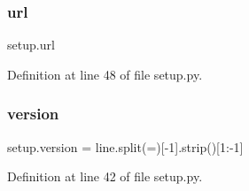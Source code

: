 \hypertarget{namespacesetup_afc13124aa5c0124e84e1d965e3f4b0fb}{}\label{namespacesetup_afc13124aa5c0124e84e1d965e3f4b0fb} 
\subsubsection{\texorpdfstring{url}{url}}
{\footnotesize\ttfamily setup.\+url}



Definition at line 48 of file setup.\+py.

\hypertarget{namespacesetup_a2aa722b36a933088812b50ea79b97a5c}{}\label{namespacesetup_a2aa722b36a933088812b50ea79b97a5c} 
\subsubsection{\texorpdfstring{version}{version}}
{\footnotesize\ttfamily setup.\+version = line.\+split(\textquotesingle{}=\textquotesingle{})\mbox{[}-\/1\mbox{]}.strip()\mbox{[}1\+:-\/1\mbox{]}}



Definition at line 42 of file setup.\+py.

